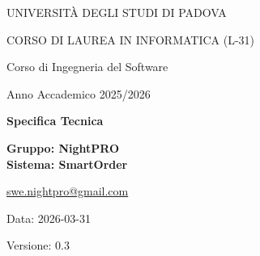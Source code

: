 \documentclass[a4paper, 11pt, oneside]{scrartcl}
\begin{document}
\thispagestyle{empty}
\begin{titlepage}
    \centering
    \vspace*{1cm}

    \vfill

    {\small UNIVERSIT\`A DEGLI STUDI DI PADOVA \par}
    {\small CORSO DI LAUREA IN INFORMATICA (L-31) \par}
    \vspace{0.5cm}
    {\large Corso di Ingegneria del Software \par}
    {\small Anno Accademico 2025/2026 \par}
    \vfill

    {\Huge \bfseries Specifica Tecnica \par}
    \vspace{1cm}

    \vfill

    {\Large \bfseries Gruppo: NightPRO}    \vspace{0.5cm}\\
    {\Large \bfseries Sistema: SmartOrder}    \vspace{0.5cm}

    {\large \href{mailto:swe.nightpro@gmail.com}{swe.nightpro@gmail.com}}\\[2cm]

    {\large Data: 2026-03-31 \par}

    {\Large Versione: 0.3\par}

\end{titlepage}

\newpage
\pagestyle{fancy}
\end{document}
